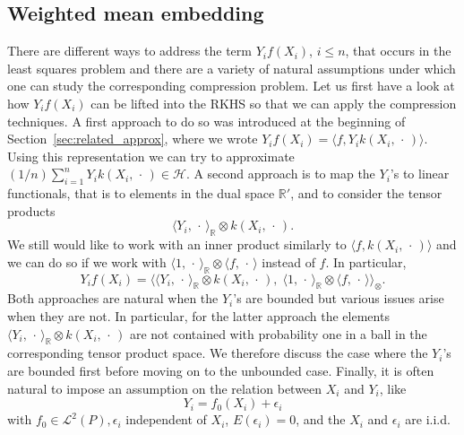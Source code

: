 \documentclass[10pt]{amsart}
\theoremstyle{definition}\newtheorem{defi}[theo]{Definition}\newtheorem{rema}[theo]{Remark}\newtheorem{exam}[theo]{Example}\newtheorem{exem}[theo]{Example}\newtheorem{nota}[theo]{Notation}
\theoremstyle{remark}
\newcommand{\R}{\mathbb{R}}
\newcommand{\cH}{\mathcal{H}}
\newcommand{\clL}{\mathcal{L}}
\begin{document}
\subsection{Weighted mean embedding} \label{sec:DealWithY}
There are different ways to address the term $Y_i f(X_i)$, $i\leq n$, that occurs in the least squares problem and there are a variety of natural assumptions under which one can study the corresponding compression problem. Let us first have a look at how $Y_i f(X_i)$ can be lifted into the RKHS so that we can apply the compression techniques. A first approach to do so was introduced at the beginning of Section~\ref{sec:related_approx}, where we wrote $Y_i f(X_i) = \langle f, Y_i k(X_i,\,\cdot\,)\rangle$. Using this representation we can try to approximate $(1/n) \sum_{i=1}^n Y_i k(X_i,\,\cdot\,) \in \cH$. A second approach is to map the $Y_i$'s to linear functionals, that is to elements in the dual space $\R'$, and to consider the tensor products
\[
\langle Y_i, \,\cdot\, \rangle_\R \otimes k(X_i,\,\cdot\,).
\]
We still would like to work with an inner product similarly to $\langle f, k(X_i,\,\cdot\,) \rangle$ and we can do so if we work with $\langle 1,\,\cdot\, \rangle_\R \otimes \langle f,\,\cdot\, \rangle$ instead of $f$. In particular,
\begin{equation}\label{eq:second_modelling_appr}
Y_i f(X_i) = \bigl\langle \langle Y_i, \,\cdot\, \rangle_\R \otimes k(X_i,\,\cdot\,),\; \langle 1,\,\cdot\, \rangle_\R \otimes \langle f,\,\cdot\, \rangle \bigr\rangle_\otimes.
\end{equation}
Both approaches are natural when the $Y_i$'s are bounded but various issues arise when they are not. In particular, for the latter approach the elements $ \langle Y_i, \,\cdot\, \rangle_\R \otimes k(X_i,\,\cdot\,)$ are not contained with probability one in a ball in the corresponding tensor product space. We therefore discuss the case where the $Y_i$'s are bounded first before moving on to the unbounded case. Finally, it is often natural to impose an assumption on the relation between $X_i$ and $Y_i$, like
\begin{equation}\label{eq:std_reg_assump}
Y_i = f_0(X_i) + \epsilon_i
\end{equation}
with $f_0 \in \clL^2(P), \epsilon_i$ independent of $X_i$, $E(\epsilon_i) = 0$, and the $X_i$ and $\epsilon_i$ are i.i.d.
\end{document}
